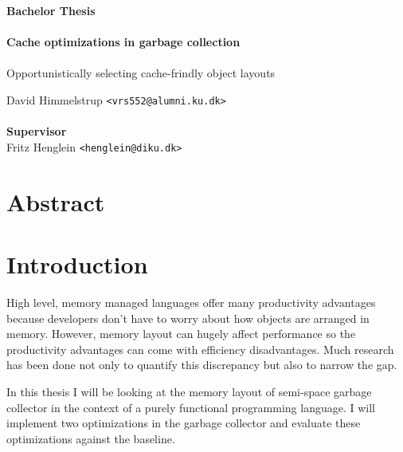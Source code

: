 \documentclass[a4paper,oneside]{memoir}
\begin{document}
    \thispagestyle{empty}
    \begin{adjustwidth}{-3cm}{-1.5cm}
    \vspace*{-1cm}
    \textbf{\Huge Bachelor Thesis} \\
    \vspace*{2.5cm} \\
    \textbf{\Huge Cache optimizations in garbage collection} \\
    \vspace*{.1cm} \\
    {\huge Opportunistically selecting cache-frindly object layouts} \\
    \begin{tabbing}
    David Himmelstrup \hspace{1cm} \= \texttt{<vrs552@alumni.ku.dk>} \\
    \\[12cm]
    \textbf{\Large Supervisor} \\
    Fritz Henglein \> \texttt{<henglein@diku.dk>} \\
    \end{tabbing}
    \end{adjustwidth}
    \newpage
    \ClearWallPaper

\chapter*{Abstract}

\newpage

\tableofcontents*

\chapter{Introduction}
High level, memory managed languages offer many productivity advantages because
developers don't have to worry about how objects are arranged in memory. However,
memory layout can hugely affect performance so the productivity advantages can
come with efficiency disadvantages. Much research has been done not only to
quantify this discrepancy but also to narrow the gap.

In this thesis I will be looking at the memory layout of semi-space garbage
collector in the context of a purely functional programming language.
I will implement two optimizations in the garbage collector and evaluate these
optimizations against the baseline.
\end{document}
